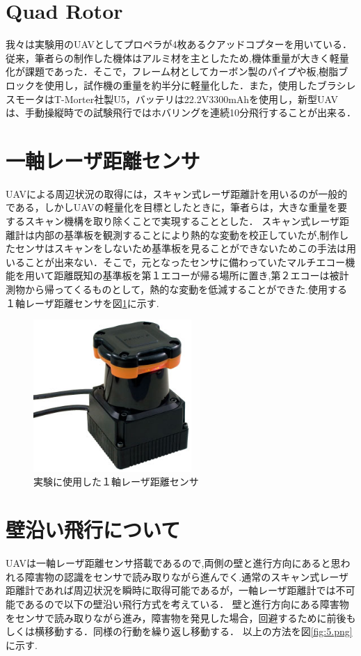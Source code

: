 \documentclass[twocolumn,11pt]{sotsuken_abst}
\begin{document}
\section{Quad Rotor}
我々は実験用のUAVとしてプロペラが4枚あるクアッドコプターを用いている．従来，筆者らの制作した機体はアルミ材を主としたため,機体重量が大きく軽量化が課題であった．そこで，フレーム材としてカーボン製のパイプや板,樹脂ブロックを使用し，試作機の重量を約半分に軽量化した．また，使用したブラシレスモータはT-Morter社製U5，バッテリは22.2V3300mAhを使用し，新型UAVは、手動操縦時での試験飛行ではホバリングを連続10分飛行することが出来る．

\section{一軸レーザ距離センサ}
UAVによる周辺状況の取得には，スキャン式レーザ距離計を用いるのが一般的である，しかしUAVの軽量化を目標としたときに，筆者らは，大きな重量を要するスキャン機構を取り除くことで実現することとした．
スキャン式レーザ距離計は内部の基準板を観測することにより熱的な変動を校正していたが,制作したセンサはスキャンをしないため基準板を見ることができないためこの手法は用いることが出来ない．そこで，元となったセンサに備わっていたマルチエコー機能を用いて距離既知の基準板を第１エコーが帰る場所に置き,第２エコーは被計測物から帰ってくるものとして，熱的な変動を低減することができた.使用する１軸レーザ距離センサを図\ref{fig:sensor.png}に示す.

\begin{figure}[htbp]
  \begin{center}
    \includegraphics[width=60mm]{img/sensor.png}
    \end{center}
  \caption{実験に使用した１軸レーザ距離センサ}
 \label{fig:sensor.png}
\end{figure}

\section{壁沿い飛行について}
UAVは一軸レーザ距離センサ搭載であるので,両側の壁と進行方向にあると思われる障害物の認識をセンサで読み取りながら進んでく.通常のスキャン式レーザ距離計であれば周辺状況を瞬時に取得可能であるが，一軸レーザ距離計では不可能であるので以下の壁沿い飛行方式を考えている．
壁と進行方向にある障害物をセンサで読み取りながら進み，障害物を発見した場合，回避するために前後もしくは横移動する．同様の行動を繰り返し移動する．
以上の方法を図\ref{fig:5.png}に示す.
\end{document}
